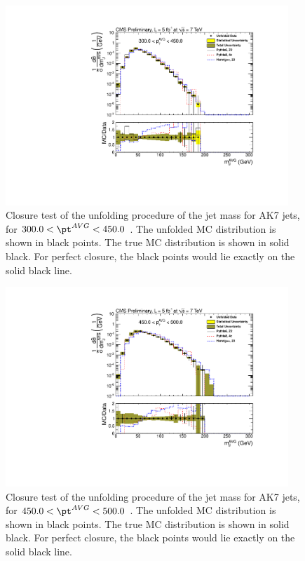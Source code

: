 \begin{figure}[htbp]
\centering
\includegraphics[width=0.95\textwidth]{figs/unfoldedMeasurementDijets_5_closuretest}
\caption{Closure test of the unfolding procedure of the jet mass for AK7 jets,
for $300.0 < \pt^{AVG} < 450.0$ \GeVc. The unfolded MC distribution is shown in black points.
The true MC distribution is shown in solid black. For perfect closure, the black points would
lie exactly on the solid black line.  
\label{figs:unfoldedMeasurementDijets_5_closuretest}}
\end{figure}



\begin{figure}[htbp]
\centering
\includegraphics[width=0.95\textwidth]{figs/unfoldedMeasurementDijets_6_closuretest}
\caption{Closure test of the unfolding procedure of the jet mass for AK7 jets,
for $450.0 < \pt^{AVG} < 500.0$ \GeVc. The unfolded MC distribution is shown in black points.
The true MC distribution is shown in solid black. For perfect closure, the black points would
lie exactly on the solid black line.  
\label{figs:unfoldedMeasurementDijets_6_closuretest}}
\end{figure}




